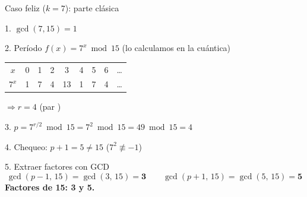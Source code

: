 \documentclass[aspectratio=169]{beamer}
\begin{document}
\begin{frame}{Caso feliz ($k=7$): parte clásica}
  \begin{block}{1. $\gcd(7,15)=1$ \checkmark}
  \end{block}

  \begin{block}{2. Período $f(x)=7^x\bmod 15$ \quad (lo calculamos en la cuántica)}
    \begin{tabular}{c|cccccccc}
      $x$    & 0 & 1 & 2 & 3  & 4 & 5 & 6 & \ldots \\
      $7^x$  & 1 & 7 & 4 & 13 & 1 & 7 & 4 & \ldots
    \end{tabular}
    \quad$\Rightarrow r=4$ (par \checkmark)
  \end{block}

  \begin{block}{3. $p = 7^{r/2}\bmod 15 = 7^2\bmod 15 = 49\bmod 15 = 4$}
  \end{block}

  \begin{block}{4. Chequeo: $p+1=5\neq 15$ \checkmark \quad ($7^2\not\equiv -1$)}
  \end{block}

  \begin{exampleblock}{5. Extraer factores con GCD}
    \[
      \gcd(p-1,\,15)=\gcd(3,\,15)=\mathbf{3}
      \qquad
      \gcd(p+1,\,15)=\gcd(5,\,15)=\mathbf{5}
    \]
    \centering\textbf{Factores de 15: 3 y 5. \checkmark\checkmark}
  \end{exampleblock}

\end{frame}
\end{document}
